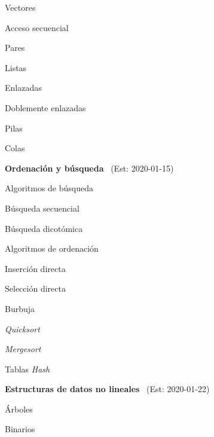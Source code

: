 \begin{longenum}
\begin{longenum}
\begin{longenum}
            \item Vectores
        \end{longenum}
        \item Acceso secuencial
        \begin{longenum}
            \item Pares
            \item Listas
            \begin{longenum}
                \item Enlazadas
                \item Doblemente enlazadas
            \end{longenum}
            \item Pilas
            \item Colas
        \end{longenum}
    \end{longenum}
    \item \textbf{Ordenación y búsqueda} \ (Est: 2020-01-15)
    \begin{longenum}
        \item Algoritmos de búsqueda
        \begin{longenum}
            \item Búsqueda secuencial
            \item Búsqueda dicotómica
        \end{longenum}
        \item Algoritmos de ordenación
        \begin{longenum}
            \item Inserción directa
            \item Selección directa
            \item Burbuja
            \item \textit{Quicksort}
            \item \textit{Mergesort}
        \end{longenum}
        \item Tablas \textit{Hash}
    \end{longenum}
    \item \textbf{Estructuras de datos no lineales} \ (Est: 2020-01-22)
    \begin{longenum}
        \item Árboles
        \begin{longenum}
            \item Binarios
            \begin{longenum}

\end{longenum}
\end{longenum}
\end{longenum}
\end{longenum}
